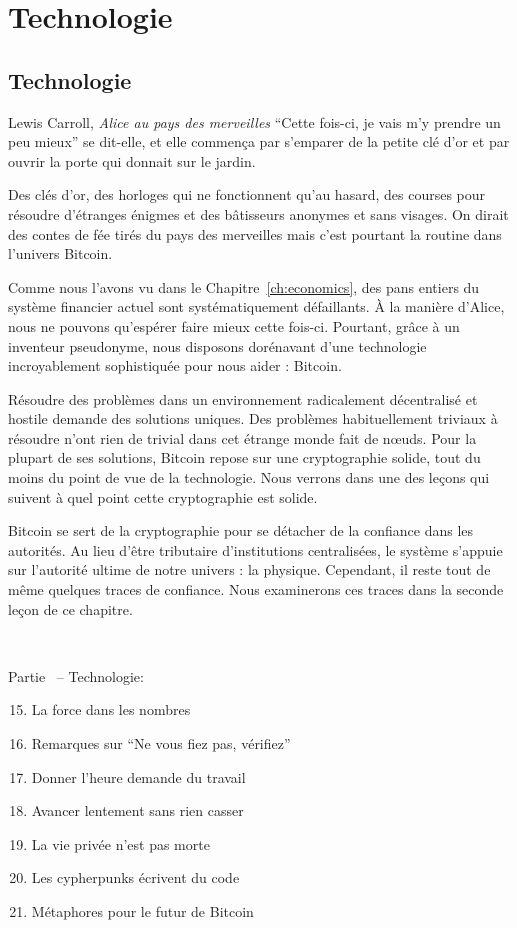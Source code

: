 \part{Technologie}
\label{ch:technology}
\chapter*{Technologie}

\begin{chapquote}{Lewis Carroll, \textit{Alice au pays des merveilles}}
\enquote{Cette fois-ci, je vais m’y prendre un peu mieux} se dit-elle, et elle
commença par s’emparer de la petite clé d’or et par ouvrir la porte qui donnait
sur le jardin.
\end{chapquote}

Des clés d'or, des horloges qui ne fonctionnent qu'au hasard, des courses pour
résoudre d'étranges énigmes et des bâtisseurs anonymes et sans visages. On
dirait des contes de fée tirés du pays des merveilles mais c'est pourtant la
routine dans l'univers Bitcoin.

Comme nous l'avons vu dans le Chapitre~\ref{ch:economics}, des pans entiers du
système financier actuel sont systématiquement défaillants. À la manière
d'Alice, nous ne pouvons qu'espérer faire mieux cette fois-ci. Pourtant, grâce à
un inventeur pseudonyme, nous disposons dorénavant d'une technologie
incroyablement sophistiquée pour nous aider : Bitcoin.

Résoudre des problèmes dans un environnement radicalement décentralisé et
hostile demande des solutions uniques. Des problèmes habituellement triviaux à
résoudre n'ont rien de trivial dans cet étrange monde fait de nœuds. Pour la
plupart de ses solutions, Bitcoin repose sur une cryptographie solide, tout du
moins du point de vue de la technologie. Nous verrons dans une des leçons qui
suivent à quel point cette cryptographie est solide.

Bitcoin se sert de la cryptographie pour se détacher de la confiance dans les
autorités. Au lieu d'être tributaire d'institutions centralisées, le système
s'appuie sur l'autorité ultime de notre univers : la physique. Cependant, il
reste tout de même quelques traces de confiance. Nous examinerons ces traces
dans la seconde leçon de ce chapitre.

~

\begin{samepage}
Partie~\ref{ch:technology} -- Technologie:

\begin{enumerate}
  \setcounter{enumi}{14}
  \item La force dans les nombres
  \item Remarques sur \enquote{Ne vous fiez pas, vérifiez}
  \item Donner l'heure demande du travail
  \item Avancer lentement sans rien casser
  \item La vie privée n'est pas morte
  \item Les cypherpunks écrivent du code
  \item Métaphores pour le futur de Bitcoin
\end{enumerate}
\end{samepage}

